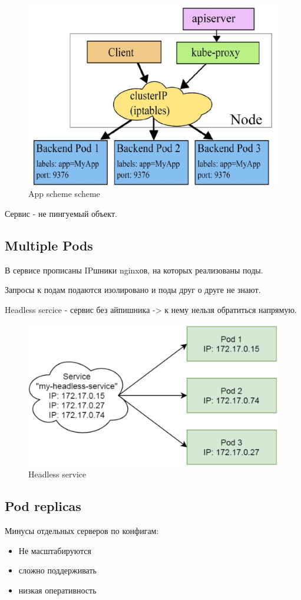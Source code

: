 \begin{figure}[H]
	\centering
	\begin{minipage}[b]{0.4\textwidth}
		\includegraphics[width=\textwidth]{images/kapp.png}
        \caption{App scheme scheme}
	\end{minipage}
\end{figure}

Сервис - не пингуемый объект.

\subsection*{Multiple Pods}

В сервисе прописаны IPшники nginxов, на которых реализованы поды.

Запросы к подам подаются изолировано и поды друг о друге не знают.

Headless sercice - сервис без айпишника -> к нему нельзя обратиться напрямую.
\begin{figure}[H]
	\centering
	\begin{minipage}[b]{0.4\textwidth}
		\includegraphics[width=\textwidth]{images/hls.png}
        \caption{Headless service}
	\end{minipage}
\end{figure}

\subsection*{Pod replicas}

Минусы отдельных серверов по конфигам:
\begin{itemize}
    \item Не масштабируются
    \item сложно поддерживать
    \item низкая оперативность
\end{itemize}
